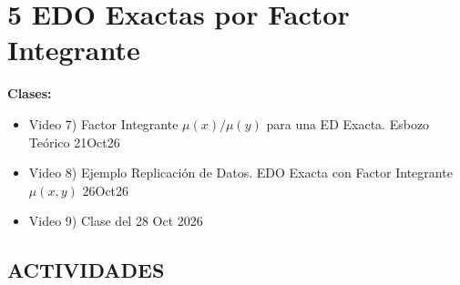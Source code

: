 \section{5 EDO Exactas por Factor Integrante}

\begin{tcolorbox}[enunciado]
\textbf{Clases:}
\begin{itemize}[leftmargin=*]
    \item Video 7) Factor Integrante $\mu(x)/\mu(y)$ para una ED Exacta. Esbozo Teórico 21Oct26
    \item Video 8) Ejemplo Replicación de Datos. EDO Exacta con Factor Integrante $\mu(x,y)$ 26Oct26
    \item Video 9) Clase del 28 Oct 2026
\end{itemize}
\end{tcolorbox}

\subsection*{ACTIVIDADES}

